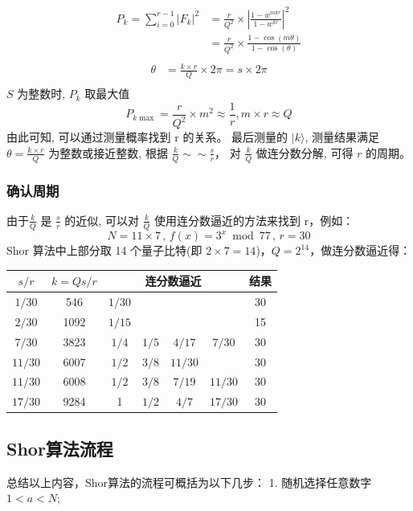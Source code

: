 \documentclass[12pt,hyperref,a4paper,UTF8]{ctexart}
\begin{document}
$$
\begin{aligned}
P_k=\sum\limits_{i=0}^{r-1}\left|F_k\right|^2&=\frac{r}{Q^2} \times\left|\frac{1-w^{m k r}}{1-w^{k r}}\right|^2 \\
&=\frac{r}{Q^2} \times \frac{1-\cos (m \theta)}{1-\cos (\theta)} \\
\end{aligned}
$$
$$
\begin{aligned}
\theta&=\frac{k \times r}{Q} \times 2 \pi = s \times 2\pi\\
\end{aligned}
$$
$S$ 为整数时, $P_k$ 取最大值
$$
P_{k \max }=\frac{r}{Q^2} \times m^2 \approx \frac{1}{r}, m \times r \approx Q
$$
由此可知, 可以通过测量概率找到 $\mathrm{r}$ 的关系。
最后测量的 $|k\rangle$, 测量结果满足 $\theta=\frac{k \times r}{Q}$ 为整数或接近整数, 根据 $\frac{k}{Q} \sim \sim \frac{s}{r}$， 对 $\frac{k}{Q}$ 做连分数分解, 可得 $r$ 的周期。

\subsubsection{确认周期}

由于$\frac{k}{Q}$ 是 $\frac{s}{r}$ 的近似, 可以对 $\frac{k}{Q}$ 使用连分数逼近的方法来找到 $\mathrm{r}$，例如：
$$
N=11 \times 7 \,,\, f(x)=3^x \bmod 77\,,\, r=30
$$
Shor 算法中上部分取 14 个量子比特(即 $2 \times 7=14$)，$Q=2^{14}$，做连分数逼近得：
\vskip 5pt
\begin{center}
\begin{tabular}{|c|c|c|c|c|c|c|}
    \hline$s / r$ & $k=Q s / r$ & \multicolumn{4}{|c|}{ 连分数逼近 } & 结果 \\
    \hline $1 / 30$ & 546 & $1 / 30$ & & & & 30 \\
    \hline $2 / 30$ & 1092 & $1 / 15$ & & & & 15 \\
    \hline $7 / 30$ & 3823 & $1 / 4$ & $1 / 5$ & $4 / 17$ & $7 / 30$ & 30 \\
    \hline $11 / 30$ & 6007 & $1 / 2$ & $3 / 8$ & $11 / 30$ & & 30 \\
    \hline $11 / 30$ & 6008 & $1 / 2$ & $3 / 8$ & $7 / 19$ & $11 / 30$ & 30 \\
    \hline $17 / 30$ & 9284 & 1 & $1 / 2$ & $4 / 7$ & $17 / 30$ & 30 \\
    \hline
\end{tabular}
\end{center}

\subsection{Shor算法流程}
总结以上内容，Shor算法的流程可概括为以下几步：
\vskip 5pt
1. 随机选择任意数字 $1<a<N$;
\end{document}
